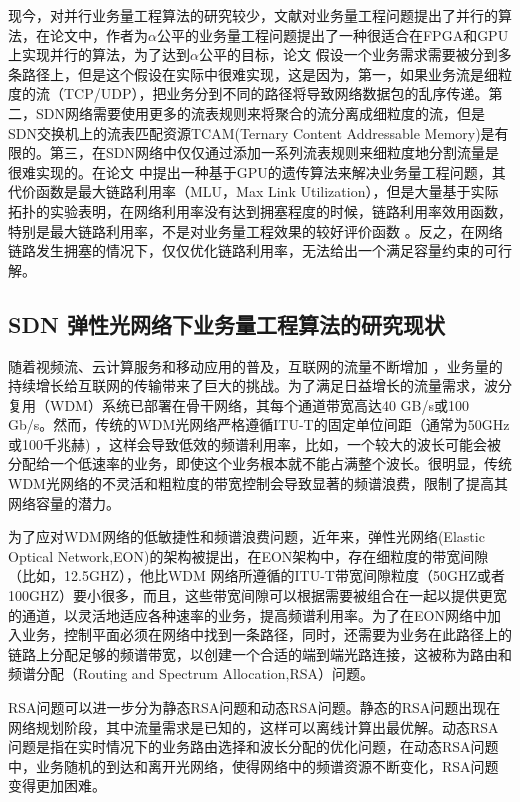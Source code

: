 \documentclass[master]{thesis-uestc}
\begin{document}
现今，对并行业务量工程算法的研究较少，文献对业务量工程问题提出了并行的算法，在论文中，作者为$\alpha$公平的业务量工程问题提出了一种很适合在FPGA和GPU上实现并行的算法，为了达到$\alpha$公平的目标，论文 假设一个业务需求需要被分到多条路径上，但是这个假设在实际中很难实现，这是因为，第一，如果业务流是细粒度的流（TCP/UDP），把业务分到不同的路径将导致网络数据包的乱序传递。第二，SDN网络需要使用更多的流表规则来将聚合的流分离成细粒度的流，但是SDN交换机上的流表匹配资源TCAM(Ternary Content Addressable Memory)是有限的。第三，在SDN网络中仅仅通过添加一系列流表规则来细粒度地分割流量是很难实现的。在论文 中提出一种基于GPU的遗传算法来解决业务量工程问题，其代价函数是最大链路利用率（MLU，Max Link Utilization），但是大量基于实际拓扑的实验表明，在网络利用率没有达到拥塞程度的时候，链路利用率效用函数，特别是最大链路利用率，不是对业务量工程效果的较好评价函数 。反之，在网络链路发生拥塞的情况下，仅仅优化链路利用率，无法给出一个满足容量约束的可行解。

\subsection{SDN 弹性光网络下业务量工程算法的研究现状}
随着视频流、云计算服务和移动应用的普及，互联网的流量不断增加 ，业务量的持续增长给互联网的传输带来了巨大的挑战。为了满足日益增长的流量需求，波分复用（WDM）系统已部署在骨干网络，其每个通道带宽高达40 GB/s或100 Gb/s。然而，传统的WDM光网络严格遵循ITU-T的固定单位间距（通常为50GHz或100千兆赫) ，这样会导致低效的频谱利用率，比如，一个较大的波长可能会被分配给一个低速率的业务，即使这个业务根本就不能占满整个波长。很明显，传统WDM光网络的不灵活和粗粒度的带宽控制会导致显著的频谱浪费，限制了提高其网络容量的潜力。

为了应对WDM网络的低敏捷性和频谱浪费问题，近年来，弹性光网络(Elastic Optical Network,EON)的架构被提出，在EON架构中，存在细粒度的带宽间隙（比如，12.5GHZ），他比WDM 网络所遵循的ITU-T带宽间隙粒度（50GHZ或者100GHZ）要小很多，而且，这些带宽间隙可以根据需要被组合在一起以提供更宽的通道，以灵活地适应各种速率的业务，提高频谱利用率。为了在EON网络中加入业务，控制平面必须在网络中找到一条路径，同时，还需要为业务在此路径上的链路上分配足够的频谱带宽，以创建一个合适的端到端光路连接，这被称为路由和频谱分配（Routing and Spectrum Allocation,RSA）问题。

RSA问题可以进一步分为静态RSA问题和动态RSA问题。静态的RSA问题出现在网络规划阶段，其中流量需求是已知的，这样可以离线计算出最优解。动态RSA问题是指在实时情况下的业务路由选择和波长分配的优化问题，在动态RSA问题中，业务随机的到达和离开光网络，使得网络中的频谱资源不断变化，RSA问题变得更加困难。
\end{document}

